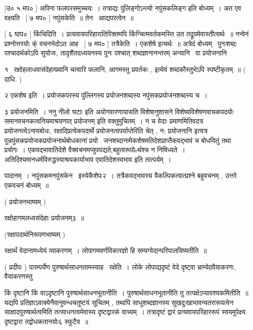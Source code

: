 \documentclass[11pt, openany]{book}
\begin{document}
 [उ० ५ मप० ] अपिना फलपरसमुच्चयः~। तत्राद्यः
पुंलिङ्गोऽन्त्यो नपुंसकलिङ्ग इति बोध्यम्~। अत एव वक्ष्यति \textendash\ [ ७ मप०
] नपुंसकेति~॥ तेन \textendash\ आद्यपरत्वेन~॥ 

 [ ६ ष्ठप० ] किंचिदिति~। प्रत्यवायपरिहारातिरिक्तमपि
किंन्चित्मवर्तकमस्ति उत तद्रूपमेवास्तीत्यर्थः~॥ नन्वेनं प्रश्नोत्तरयोः
क्ं वचनभेदोऽत आह \textendash\ [ ७ मप० ] तत्रैकेति~। एकशेषे इत्यर्थः~॥
अत्रेदं बोध्यम् \textendash\ पुनःशब्दः पश्चादर्थकोऽपि सुयोजः, तादृशैतदध्ययनस्य
पुनः पश्चात् शब्दज्ञानानन्तरम् अन्यानि \textendash\ वा प्रयोजनानि 



१ \textendash\ {\qt रक्षोहलाधवासंदेहाख्यानि} चत्वारि फलानि, आगमस्तु प्रवर्तकः , इत्येवं
शब्दकौस्तुभेऽपि स्पष्टीकृतम्~॥ ( दाधि. ) 

२ एकशेष इति~। प्रयोजकपरस्य पुंल्लिगस्य प्रयोजनशब्दस्य
नपुंसकप्रयोजनशब्दस्य च~। 

३ प्रयोजनमिति~। ननु {\qt नीलो घटाः} इति अयोगवारणायासति विशेषानुशासने
विशेष्यविशेषणवाचकपदयोः समानवचनकत्वनियमाश्रयणात् {\qt  प्रयोजनम्} इति
वक्तुमुचितम्~। न च वेदाः प्रमाणमितिवदत्र प्रयोजनत्वेऽन्वयबोधः,
रक्षादिप्रत्येकपदार्थे प्रयोजनत्वपर्याप्तेरिति चेत् , न; {\qt प्रयोजनानि}
इत्यत्र पुन्नपुंसकप्रयोजकप्रयोजनार्थबोधकानां
प्रयो \textendash\ जनशब्दानामेकशेषमतिदेशप्राप्तैकवद्भावं च बोधयितुं तथा प्रयोगः~। 
एकवद्भावातिदेशे वैक्वचनमप्युपपद्यते,बहुत्वरूपोsर्थश्च न निषिध्यते~। 
अतिदिश्यमानधर्मविरुद्धस्याश्रयकार्याभाव एवातिदेशस्वभाव इति तात्पर्यम्~। 





पादानम्~। {\qt नपुंसकमनपुंसकेन} \textendash\ इस्येकैशेपः२~। तत्रैकवद्भावस्य
वैकल्पिकत्वात्प्रश्ने बहुवचनम् , उत्तरे एकवचनं बोध्यम्~॥ 

 ( प्रयोजनभाष्यम् ) 

 रक्षोहागमलध्वसंदेहाः प्रयोजनम्३~॥ 

 (रक्षापदार्थनिरूपणभाष्यम् ) 

 रक्षार्थं वेदानामध्येयं व्याकरणम्~। लोपागमवर्णविकारज्ञो हि
सम्यग्वेदान्परिपालयिष्यतीति~॥ 

 ( प्रदीपः ) पारम्पर्येण पुरुषार्थसाधनतामस्याह \textendash\ रक्षेति~। लोके
लोपाद्यदृष्टं वेदे दृष्ट्वा भ्राम्येदवैयाकरणः, वैयाकरणस्तु 



किं दृष्टानि किं वाऽदृष्टानि पुरुषार्थसाधनभूतानीति~। 
पुरुषार्थसाधनभूतानीति तु तत्पक्षेऽप्यावश्यकमितीति~॥ यद्यपि
प्रतिज्ञाऽवाक्येनैवानुवन्धचतुष्टयं सूचितम् , तथापि साधुशब्दज्ञानस्य
सुखदुःखाभावन्यतरारूपत्वेन साक्षादपुरुषार्थत्वमिति तत्साधनत्वमेवास्य
दृष्टद्वारकं वाच्यम्~। तत्रादृष्टं द्वारं प्रत्यवायपरिहाररूपं
स्वयमुपेक्ष्य दृष्टद्वारा तद्वोधकतानयोः६ स्फुटैव~॥ 
\end{document}
